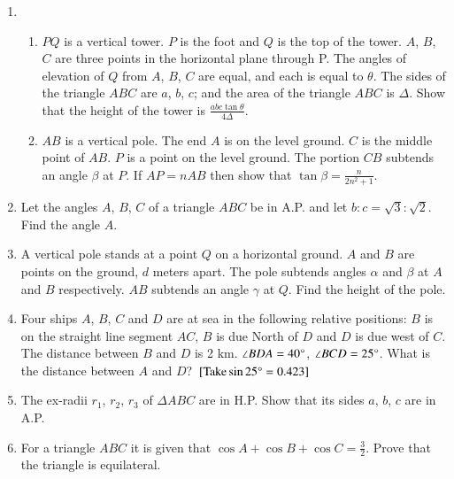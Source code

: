 \documentclass[journal]{IEEEtran}
\begin{document}
\begin{enumerate}

\item 
\begin{enumerate}
\item $PQ$ is a vertical tower. $P$ is the foot and $Q$ is the top of the tower. $A$, $B$, $C$ are three points in the horizontal plane through P. The angles of elevation of $Q$ from $A$, $B$, $C$ are equal, and each is equal to $\theta$. The sides of the triangle $ABC$ are $a$, $b$, $c$; and the area of the triangle $ABC$ is $\Delta$. Show that the height of the tower is $\frac{abc\tan{\theta}}{4\Delta}$.
\item $AB$ is a vertical pole. The end $A$ is on the level ground. $C$ is the middle point of $AB$. $P$ is a point on the level ground. The portion $CB$ subtends an angle $\beta$ at $P$. If $AP=nAB$ then show that $\tan{\beta}=\frac{n}{2n^2+1}$.
\end{enumerate}

\hfill{}

\item Let the angles $A$, $B$, $C$ of a triangle $ABC$ be in A.P. and let $b:c=\sqrt{3}:\sqrt{2}$. Find the angle $A$. 

\hfill{}

\item A vertical pole stands at a point $Q$ on a horizontal ground. $A$ and $B$ are points on the ground, $d$ meters apart. The pole subtends angles $\alpha$ and $\beta$ at $A$ and $B$ respectively. $AB$ subtends an angle $\gamma$ at $Q$. Find the height of the pole. 

\hfill{}

\item Four ships $A$, $B$, $C$ and $D$ are at sea in the following relative positions: $B$ is on the straight line segment $AC$, $B$ is due North of $D$ and $D$ is due west of $C$. The distance between $B$ and $D$ is 2 km. $\angle{BDA}=40\degree$, $\angle{BCD}=25\degree$. What is the distance between $A$ and $D$? ${}\left[\text{Take} \sin{25\degree}=0.423\right]$

\hfill{}

\item The ex-radii $r_1$, $r_2$, $r_3$ of $\Delta ABC$ are in H.P. Show that its sides $a$, $b$, $c$ are in A.P.

\hfill{} 

\item For a triangle $ABC$ it is given that $\cos{A}+\cos{B}+\cos{C}=\frac{3}{2}$. Prove that the triangle is equilateral. 


\end{enumerate}
\end{document}

